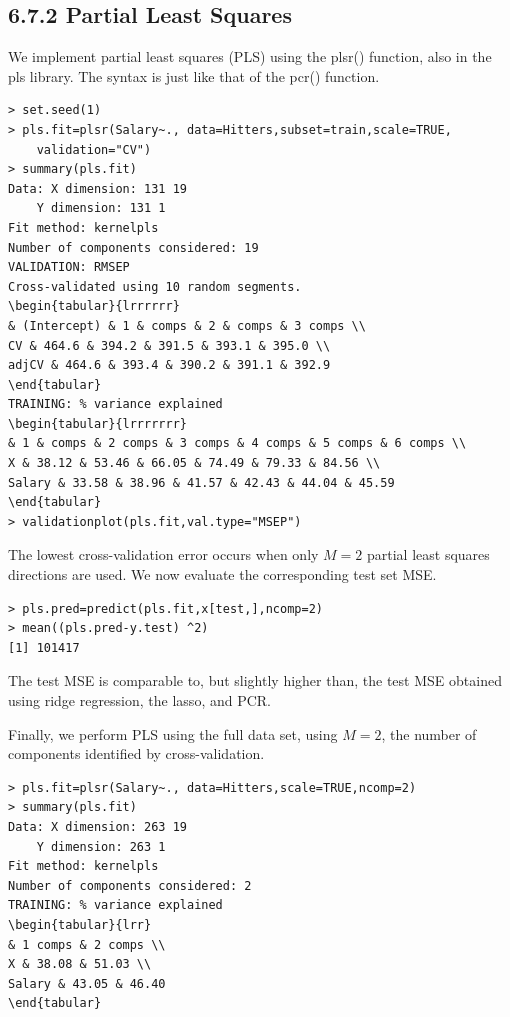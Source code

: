 \documentclass[10pt]{article}
\begin{document}
\subsection*{6.7.2 Partial Least Squares}
We implement partial least squares (PLS) using the plsr() function, also in the pls library. The syntax is just like that of the pcr() function.

\begin{verbatim}
> set.seed(1)
> pls.fit=plsr(Salary~., data=Hitters,subset=train,scale=TRUE,
    validation="CV")
> summary(pls.fit)
Data: X dimension: 131 19
    Y dimension: 131 1
Fit method: kernelpls
Number of components considered: 19
VALIDATION: RMSEP
Cross-validated using 10 random segments.
\begin{tabular}{lrrrrrr} 
& (Intercept) & 1 & comps & 2 & comps & 3 comps \\
CV & 464.6 & 394.2 & 391.5 & 393.1 & 395.0 \\
adjCV & 464.6 & 393.4 & 390.2 & 391.1 & 392.9
\end{tabular}
TRAINING: % variance explained
\begin{tabular}{lrrrrrrr} 
& 1 & comps & 2 comps & 3 comps & 4 comps & 5 comps & 6 comps \\
X & 38.12 & 53.46 & 66.05 & 74.49 & 79.33 & 84.56 \\
Salary & 33.58 & 38.96 & 41.57 & 42.43 & 44.04 & 45.59
\end{tabular}
> validationplot(pls.fit,val.type="MSEP")
\end{verbatim}

The lowest cross-validation error occurs when only $M=2$ partial least squares directions are used. We now evaluate the corresponding test set MSE.

\begin{verbatim}
> pls.pred=predict(pls.fit,x[test,],ncomp=2)
> mean((pls.pred-y.test) ^2)
[1] 101417
\end{verbatim}

The test MSE is comparable to, but slightly higher than, the test MSE obtained using ridge regression, the lasso, and PCR.

Finally, we perform PLS using the full data set, using $M=2$, the number of components identified by cross-validation.

\begin{verbatim}
> pls.fit=plsr(Salary~., data=Hitters,scale=TRUE,ncomp=2)
> summary(pls.fit)
Data: X dimension: 263 19
    Y dimension: 263 1
Fit method: kernelpls
Number of components considered: 2
TRAINING: % variance explained
\begin{tabular}{lrr} 
& 1 comps & 2 comps \\
X & 38.08 & 51.03 \\
Salary & 43.05 & 46.40
\end{tabular}
\end{verbatim}
\end{document}
